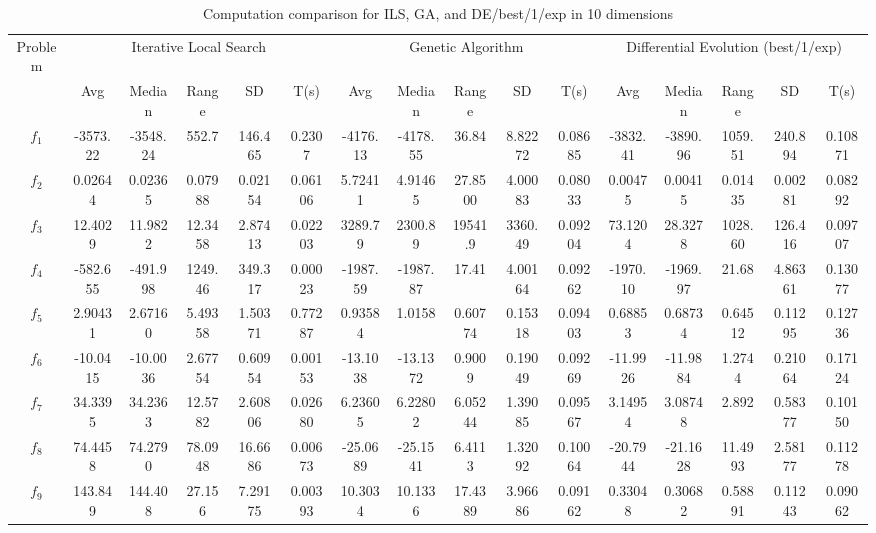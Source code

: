 \documentclass[paper=a4, fontsize=11pt]{scrartcl} %
\numberwithin{equation}{section} %
\numberwithin{figure}{section} %
\numberwithin{table}{section} %
\begin{document}
\begin{landscape}
	\begin{table}
		\tiny
		\centering
		\caption{Computation comparison for ILS, GA, and DE/best/1/exp in 10 dimensions}
		\label{Tab1d}
		\begin{tabular}{c|ccccc|ccccc|ccccc}
		\noalign{\smallskip}\hline\noalign{\smallskip}
		Problem & \multicolumn{5}{c}{Iterative Local Search}& \multicolumn{5}{|c|}{Genetic Algorithm}
	        &  \multicolumn{5}{c}{Differential Evolution (best/1/exp)} \\ 
		\noalign{\smallskip}\hline\noalign{\smallskip}
			 & Avg & Median & Range & SD & T(s) & Avg & Median
	                 & Range & SD & T(s) & Avg & Median & Range & SD &
	                 T(s) \\ 
	\noalign{\smallskip}\hline\noalign{\smallskip}
	 			$f_{1}$  & -3573.22 & -3548.24 & 552.7   & 146.465 & 0.2307  & -4176.13 & -4178.55 & 36.84   & 8.82272 & 0.08685 & -3832.41 & -3890.96 & 1059.51 & 240.894 & 0.10871\\
				$f_{2}$  &  0.02644 &  0.02365 & 0.07988 & 0.02154 & 0.06106 &  5.72411 &  4.91465 & 27.8500 & 4.00083 & 0.08033 &  0.00475 &  0.00415 & 0.01435 & 0.00281 & 0.08292\\
				$f_{3}$  &  12.4029 &  11.9822 & 12.3458 & 2.87413 & 0.02203 &  3289.79 &  2300.89 & 19541.9 & 3360.49 & 0.09204 &  73.1204 &  28.3278 & 1028.60 & 126.416 & 0.09707\\
				$f_{4}$  & -582.655 & -491.998 & 1249.46 & 349.317 & 0.00023 & -1987.59 & -1987.87 & 17.41   & 4.00164 & 0.09262 & -1970.10 & -1969.97 & 21.68   & 4.86361 & 0.13077\\
				$f_{5}$  &  2.90431 &  2.67160 & 5.49358 & 1.50371 & 0.77287 &  0.93584 &  1.0158  & 0.60774 & 0.15318 & 0.09403 &  0.68853 &  0.68734 & 0.64512 & 0.11295 & 0.12736\\
				$f_{6}$  & -10.0415 & -10.0036 & 2.67754 & 0.60954 & 0.00153 & -13.1038 & -13.1372 & 0.9009  & 0.19049 & 0.09269 & -11.9926 & -11.9884 & 1.2744  & 0.21064 & 0.17124\\
				$f_{7}$  &  34.3395 &  34.2363 & 12.5782 & 2.60806 & 0.02680 &  6.23605 &  6.22802 & 6.05244 & 1.39085 & 0.09567 &  3.14954 &  3.08748 & 2.892   & 0.58377 & 0.10150\\
				$f_{8}$  &  74.4458 &  74.2790 & 78.0948 & 16.6686 & 0.00673 & -25.0689 & -25.1541 & 6.4113  & 1.32092 & 0.10064 & -20.7944 & -21.1628 & 11.4993 & 2.58177 & 0.11278\\
				$f_{9}$  &  143.849 &  144.408 & 27.156  & 7.29175 & 0.00393 &  10.3034 &  10.1336 & 17.4389 & 3.96686 & 0.09162 &  0.33048 &  0.30682 & 0.58891 & 0.11243 & 0.09062\\

\end{tabular}
\end{table}
\end{landscape}
\end{document}
